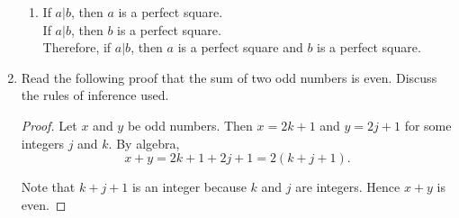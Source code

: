 \begin{enumerate}
\begin{enumerate}
\item If $a|b$, then $a$ is a perfect square.\\
If $a|b$, then $b$ is a perfect square.\\
Therefore, if $a|b$, then $a$ is a perfect square and $b$ is
a perfect square.

\end{enumerate}

\item Read the following proof that the sum of two odd numbers is even.
Discuss the rules of inference used.\\
\begin{proof}
Let $x$ and $y$ be odd numbers. Then $x=2k+1$
and $y=2j+1$ for some integers $j$ and $k$. By algebra,
\[
x+y = 2k+1 + 2j+1 = 2(k+j+1).
\]

Note that $k+j+1$ is an integer because $k$ and $j$ are integers.
Hence $x+y$ is even. 
\end{proof}
\end{enumerate}
